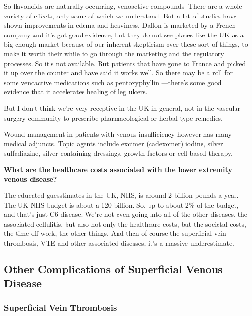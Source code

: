 \documentclass[
]{book}
\begin{document}
So flavonoids are naturally occurring, venoactive compounds. There are a
whole variety of effects, only some of which we understand. But a lot of
studies have shown improvements in edema and heaviness. Daflon is
marketed by a French company and it's got good evidence, but they do not
see places like the UK as a big enough market because of our inherent
skepticism over these sort of things, to make it worth their while to go
through the marketing and the regulatory processes. So it's not
available. But patients that have gone to France and picked it up over
the counter and have said it works well. So there may be a roll for some
venoactive medications such as pentoxyphyllin ---there's some good
evidence that it accelerates healing of leg ulcers.

But I don't think we're very receptive in the UK in general, not in the
vascular surgery community to prescribe pharmacological or herbal type
remedies.

Wound management in patients with venous insufficiency however has many
medical adjuncts. Topic agents include excimer (cadexomer) iodine,
silver sulfadiazine, silver-containing dressings, growth factors or
cell-based therapy.

\textbf{What are the healthcare costs associated with the lower extremity
venous disease?}

The educated guesstimates in the UK, NHS, is around 2 billion pounds a
year. The UK NHS budget is about a 120 billion. So, up to about 2\% of
the budget, and that's just C6 disease. We're not even going into all of
the other diseases, the associated cellulitis, but also not only the
healthcare costs, but the societal costs, the time off work, the other
things. And then of course the superficial vein thrombosis, VTE and
other associated diseases, it's a massive underestimate.

\hypertarget{other-complications-of-superficial-venous-disease}{%
\subsection{Other Complications of Superficial Venous Disease}\label{other-complications-of-superficial-venous-disease}}

\hypertarget{superficial-vein-thrombosis}{%
\subsubsection{Superficial Vein Thrombosis}\label{superficial-vein-thrombosis}}
\end{document}
